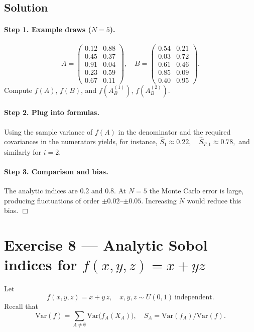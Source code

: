 \documentclass[a4paper]{article}
\begin{document}
\subsection*{Solution}

\paragraph{Step 1. Example draws ($N=5$).}
\[
A =
\begin{pmatrix}
0.12 & 0.88\\
0.45 & 0.37\\
0.91 & 0.04\\
0.23 & 0.59\\
0.67 & 0.11
\end{pmatrix},
\quad
B =
\begin{pmatrix}
0.54 & 0.21\\
0.03 & 0.72\\
0.61 & 0.46\\
0.85 & 0.09\\
0.40 & 0.95
\end{pmatrix}.
\]
Compute $f(A)$, $f(B)$, and $f(A^{(1)}_B)$, $f(A^{(2)}_B)$.

\paragraph{Step 2. Plug into formulas.}
Using the sample variance of $f(A)$ in the denominator and the required
covariances in the numerators yields, for instance,
\(
\hat S_1\approx0.22,\quad \hat S_{T,1}\approx0.78,
\)
and similarly for $i=2$.

\paragraph{Step 3. Comparison and bias.}
The analytic indices are $0.2$ and $0.8$.  At $N=5$ the Monte Carlo
error is large, producing fluctuations of order $\pm0.02$–$\pm0.05$.
Increasing $N$ would reduce this bias.  \hfill\(\Box\)

\section*{Exercise 8 — Analytic Sobol indices for $f(x,y,z)=x+yz$}
\label{ex:Sobol_analytic_improved}

Let
\[
f(x,y,z)=x + y\,z,
\quad
x,y,z\sim U(0,1)\ \text{independent}.
\]
Recall that
\[
\text{Var}(f)
=\sum_{A\neq\emptyset} \text{Var}\bigl(f_A(X_A)\bigr),
\quad
S_A = \text{Var}(f_A)/\text{Var}(f).
\]
\end{document}
